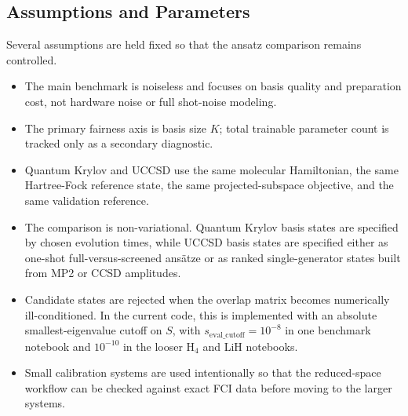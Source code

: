 \subsection{Assumptions and Parameters}

Several assumptions are held fixed so that the ansatz comparison remains controlled.

\begin{itemize}
    \item The main benchmark is noiseless and focuses on basis quality and preparation cost, not hardware noise or full shot-noise modeling.
    \item The primary fairness axis is basis size $K$; total trainable parameter count is tracked only as a secondary diagnostic.
    \item Quantum Krylov and UCCSD use the same molecular Hamiltonian, the same Hartree-Fock reference state, the same projected-subspace objective, and the same validation reference.
    \item The comparison is non-variational. Quantum Krylov basis states are specified by chosen evolution times, while UCCSD basis states are specified either as one-shot full-versus-screened ans\"atze or as ranked single-generator states built from MP2 or CCSD amplitudes.
    \item Candidate states are rejected when the overlap matrix becomes numerically ill-conditioned. In the current code, this is implemented with an absolute smallest-eigenvalue cutoff on $S$, with $s_{\mathrm{eval\_cutoff}}=10^{-8}$ in one benchmark notebook and $10^{-10}$ in the looser H$_4$ and LiH notebooks.
    \item Small calibration systems are used intentionally so that the reduced-space workflow can be checked against exact FCI data before moving to the larger systems.
\end{itemize}
